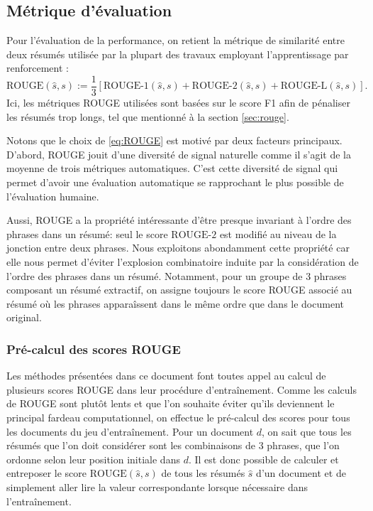 \subsection{Métrique d'évaluation}
\label{subsec:eval}

Pour l'évaluation de la performance, on retient la métrique de similarité entre deux résumés
utilisée par la plupart des travaux employant l'apprentissage par renforcement 
\citep{DBLP:journals/corr/PaulusXS17,dong2018banditsum,luo-etal-2019-reading}:
\begin{equation}
    \text{ROUGE}(\hat{s}, s) := \frac{1}{3} \left[ \text{ROUGE-1}(\hat{s}, s) + \text{ROUGE-2}(\hat{s}, s) + \text{ROUGE-L}(\hat{s}, s) \right].
    \label{eq:ROUGE}
\end{equation}
Ici, les métriques ROUGE \citep{lin-2004-rouge} utilisées sont 
basées sur le score F1 afin de pénaliser les résumés trop longs, 
tel que mentionné à la section \ref{sec:rouge}.

Notons que le choix de \eqref{eq:ROUGE} est motivé par deux facteurs principaux.
D'abord, ROUGE jouit d'une diversité de signal naturelle 
comme il s'agit de la moyenne de trois métriques automatiques.
C'est cette diversité de signal
qui permet d'avoir une évaluation automatique se rapprochant le plus
possible de l'évaluation humaine.

Aussi, ROUGE a la propriété intéressante d'être presque invariant 
à l'ordre des phrases dans un résumé: seul le score $\text{ROUGE-2}$ est 
modifié au niveau de la jonction entre deux phrases.
Nous exploitons abondamment cette propriété car elle nous permet d'éviter 
l'explosion combinatoire induite par la considération de l'ordre 
des phrases dans un résumé.
Notamment, pour un groupe de 3 phrases composant un résumé extractif, 
on assigne toujours le score ROUGE associé au résumé où les phrases 
apparaîssent dans le même ordre que dans le document original.

\subsubsection*{Pré-calcul des scores ROUGE}

Les méthodes présentées dans ce document font toutes
appel au calcul de plusieurs scores ROUGE dans leur procédure d'entraînement.
Comme les calculs de ROUGE sont plutôt lents et que l'on souhaite 
éviter qu'ils deviennent le principal fardeau computationnel, 
on effectue le pré-calcul des scores pour tous les documents du jeu 
d'entraînement.
Pour un document $d$, on sait que tous les résumés que l'on doit considérer sont 
les combinaisons de 3 phrases,
que l'on ordonne selon leur position initiale dans $d$.
Il est donc possible de calculer et entreposer le score $\text{ROUGE}(\hat{s}, s)$ 
de tous les résumés $\hat{s}$ d'un document et de simplement aller lire la valeur 
correspondante lorsque nécessaire dans l'entraînement.

